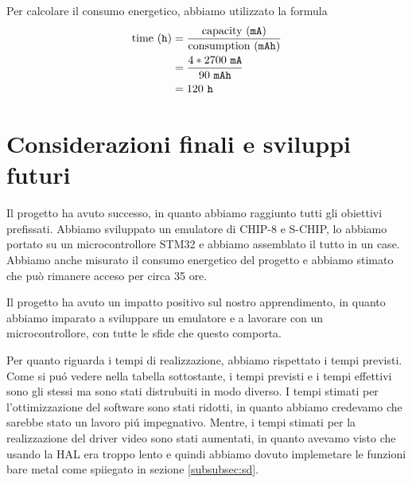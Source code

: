 \documentclass[a4paper]{article}
\begin{document}
Per calcolare il consumo energetico, abbiamo utilizzato la formula
\begin{equation*}
    \begin{aligned}
        \textmd{time} \ (\texttt{h}) & = \frac{\textmd{capacity} \ (\texttt{mA})}{\textmd{consumption} \ (\texttt{mAh})}\\
                                     & = \frac{4 * 2700 \ \texttt{mA}}{90 \ \texttt{mAh}}\\
                                     & = 120 \ \texttt{h}
    \end{aligned}
\end{equation*}

\section{Considerazioni finali e sviluppi futuri}

Il progetto ha avuto successo, in quanto abbiamo raggiunto tutti gli obiettivi prefissati. Abbiamo sviluppato un emulatore di CHIP-8 e S-CHIP, lo abbiamo portato su un microcontrollore STM32 e abbiamo assemblato il tutto in un case. Abbiamo anche misurato il consumo energetico del progetto e abbiamo stimato che può rimanere acceso per circa 35 ore.

Il progetto ha avuto un impatto positivo sul nostro apprendimento, in quanto abbiamo imparato a sviluppare un emulatore e a lavorare con un microcontrollore, con tutte le sfide che questo comporta.

Per quanto riguarda i tempi di realizzazione, abbiamo rispettato i tempi previsti. Come si pu\'o vedere nella tabella sottostante, i tempi previsti e i tempi effettivi sono gli stessi ma sono stati distrubuiti in modo diverso.
I tempi stimati per l'ottimizzazione del software sono stati ridotti, in quanto abbiamo credevamo che sarebbe stato un lavoro pi\'u impegnativo. Mentre, i tempi stimati per la realizzazione del driver video sono stati aumentati, in quanto avevamo visto che usando la HAL era troppo lento e quindi abbiamo dovuto implemetare le funzioni bare metal come spiiegato in sezione \ref{subsubsec:sd}.
\end{document}
